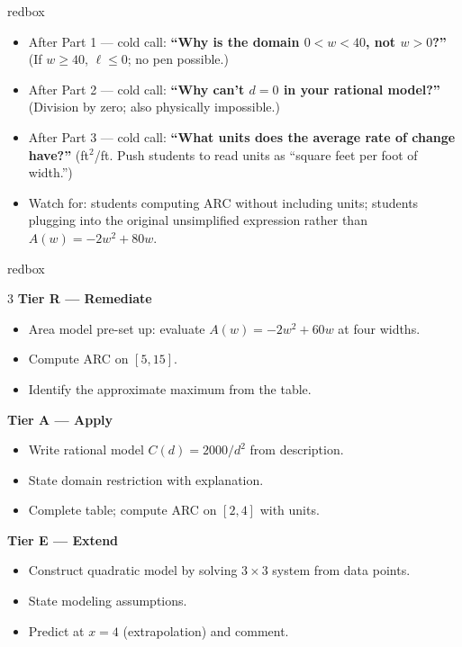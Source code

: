 \documentclass[10pt]{article}
\begin{document}
\begin{skillbox}{redbox}
\begin{itemize}[leftmargin=1.2em,itemsep=2pt,topsep=0pt]
  \item After Part 1 --- cold call: \textbf{``Why is the domain $0 < w < 40$, not $w > 0$?''}
        (If $w \geq 40$, $\ell \leq 0$; no pen possible.)
  \item After Part 2 --- cold call: \textbf{``Why can't $d = 0$ in your rational model?''}
        (Division by zero; also physically impossible.)
  \item After Part 3 --- cold call: \textbf{``What units does the average rate of change have?''}
        (ft$^2$/ft. Push students to read units as ``square feet per foot of width.'')
  \item Watch for: students computing ARC without including units; students plugging into the
        original unsimplified expression rather than $A(w) = -2w^2 + 80w$.
\end{itemize}
\end{skillbox}

\begin{skillbox}{redbox}
\begin{multicols}{3}
\textbf{Tier R --- Remediate}
\begin{itemize}[leftmargin=1em,itemsep=2pt,topsep=0pt]
  \item Area model pre-set up: evaluate $A(w) = -2w^2 + 60w$ at four widths.
  \item Compute ARC on $[5, 15]$.
  \item Identify the approximate maximum from the table.
\end{itemize}

\columnbreak

\textbf{Tier A --- Apply}
\begin{itemize}[leftmargin=1em,itemsep=2pt,topsep=0pt]
  \item Write rational model $C(d) = 2000/d^2$ from description.
  \item State domain restriction with explanation.
  \item Complete table; compute ARC on $[2, 4]$ with units.
\end{itemize}

\columnbreak

\textbf{Tier E --- Extend}
\begin{itemize}[leftmargin=1em,itemsep=2pt,topsep=0pt]
  \item Construct quadratic model by solving $3 \times 3$ system from data points.
  \item State modeling assumptions.
  \item Predict at $x = 4$ (extrapolation) and comment.
\end{itemize}
\end{multicols}
\end{skillbox}
\end{document}
